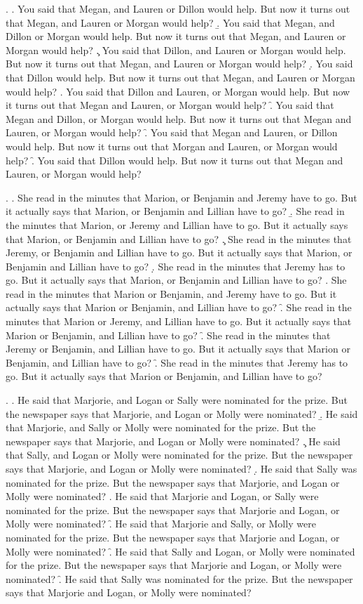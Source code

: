 \documentclass[preprint,review,12pt,authoryear,times]{elsarticle}
\begin{document}
\ex.
\a. You said that Megan, and Lauren or Dillon would help. But now it turns out that Megan, and Lauren or Morgan would help?
\b. You said that Megan, and Dillon or Morgan would help. But now it turns out that Megan, and Lauren or Morgan would help?
\c. You said that Dillon, and Lauren or Morgan would help. But now it turns out that Megan, and Lauren or Morgan would help?
\d. You said that Dillon would help. But now it turns out that Megan, and Lauren or Morgan would help?
\e. You said that Dillon and Lauren, or Morgan would help. But now it turns out that Megan and Lauren, or Morgan would help?
\f. You said that Megan and Dillon, or Morgan would help.  But now it turns out that Megan and Lauren, or Morgan would help?
\f. You said that Megan and Lauren, or Dillon would help. But now it turns out that Morgan and Lauren, or Morgan would help?
\f. You said that Dillon would help. But now it turns out that Megan and Lauren, or Morgan would help?

\ex. 
\a. She read in the minutes that Marion, or Benjamin and Jeremy have to go. But it actually says that Marion, or Benjamin and Lillian have to go?
\b. She read in the minutes that Marion, or Jeremy and Lillian have to go. But it actually says that Marion, or Benjamin and Lillian have to go?
\c. She read in the minutes that Jeremy, or Benjamin and Lillian have to go. But it actually says that Marion, or Benjamin and Lillian have to go?
\d. She read in the minutes that Jeremy has to go. But it actually says that Marion, or Benjamin and Lillian have to go?
\e. She read in the minutes that Marion or Benjamin, and Jeremy have to go. But it actually says that Marion or Benjamin, and Lillian have to go?
\f. She read in the minutes that Marion or Jeremy, and Lillian have to go. But it actually says that Marion or Benjamin, and Lillian have to go?
\f. She read in the minutes that Jeremy or Benjamin, and Lillian have to go. But it actually says that Marion or Benjamin, and Lillian have to go?
\f. She read in the minutes that Jeremy has to go. But it actually says that Marion or Benjamin, and Lillian have to go?

\ex. 
\a. He said that Marjorie, and Logan or Sally were nominated for the prize. But the newspaper says that Marjorie, and Logan or Molly were nominated?
\b. He said that Marjorie, and Sally or Molly were nominated for the prize. But the newspaper says that Marjorie, and Logan or Molly were nominated?
\c. He said that Sally, and Logan or Molly were nominated for the prize. But the newspaper says that Marjorie, and Logan or Molly were nominated?
\d. He said that Sally was nominated for the prize. But the newspaper says that Marjorie, and Logan or Molly were nominated?
\e. He said that Marjorie and Logan, or Sally were nominated for the prize. But the newspaper says that  Marjorie and Logan, or Molly were nominated?
\f. He said that Marjorie and Sally, or Molly were nominated for the prize. But the newspaper says that  Marjorie and Logan, or Molly were nominated?
\f. He said that Sally and Logan, or Molly were nominated for the prize. But the newspaper says that  Marjorie and Logan, or Molly were nominated?
\f. He said that Sally was nominated for the prize. But the newspaper says that  Marjorie and Logan, or Molly were nominated?
\end{document}
